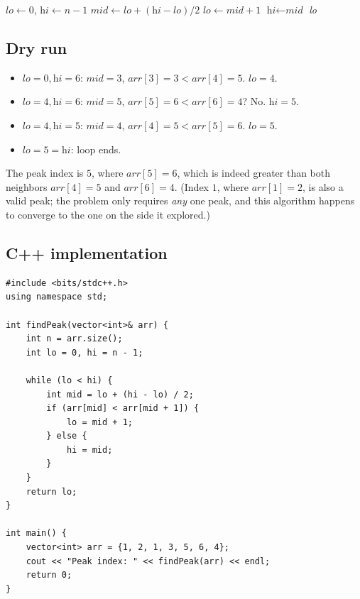\begin{algorithm}[H]
\caption{Find Peak Element}
\begin{algorithmic}[1]
  \State $\textit{lo} \gets 0$, $\textit{hi} \gets n-1$
    \State $\textit{mid} \gets \textit{lo}+(\textit{hi}-\textit{lo})/2$
      \State $\textit{lo} \gets \textit{mid} + 1$
    \Else
      \State $\textit{hi} \gets \textit{mid}$
    \EndIf
  \EndWhile
  \State \Return \textit{lo}
\EndProcedure
\end{algorithmic}
\end{algorithm}

\subsection*{Dry run}


\begin{itemize}
  \item $\textit{lo}=0,\textit{hi}=6$: $\textit{mid}=3$,
        $\textit{arr}[3]=3 < \textit{arr}[4]=5$. $\textit{lo}=4$.
  \item $\textit{lo}=4,\textit{hi}=6$: $\textit{mid}=5$,
        $\textit{arr}[5]=6 < \textit{arr}[6]=4$? No. $\textit{hi}=5$.
  \item $\textit{lo}=4,\textit{hi}=5$: $\textit{mid}=4$,
        $\textit{arr}[4]=5 < \textit{arr}[5]=6$. $\textit{lo}=5$.
  \item $\textit{lo}=5=\textit{hi}$: loop ends.
\end{itemize}

The peak index is $5$, where $\textit{arr}[5]=6$, which is indeed greater
than both neighbors $\textit{arr}[4]=5$ and $\textit{arr}[6]=4$. (Index $1$,
where $\textit{arr}[1]=2$, is also a valid peak; the problem only requires
\emph{any} one peak, and this algorithm happens to converge to the one on
the side it explored.)

\subsection*{C++ implementation}

\begin{lstlisting}
#include <bits/stdc++.h>
using namespace std;

int findPeak(vector<int>& arr) {
    int n = arr.size();
    int lo = 0, hi = n - 1;

    while (lo < hi) {
        int mid = lo + (hi - lo) / 2;
        if (arr[mid] < arr[mid + 1]) {
            lo = mid + 1;
        } else {
            hi = mid;
        }
    }
    return lo;
}

int main() {
    vector<int> arr = {1, 2, 1, 3, 5, 6, 4};
    cout << "Peak index: " << findPeak(arr) << endl;
    return 0;
}
\end{lstlisting}

